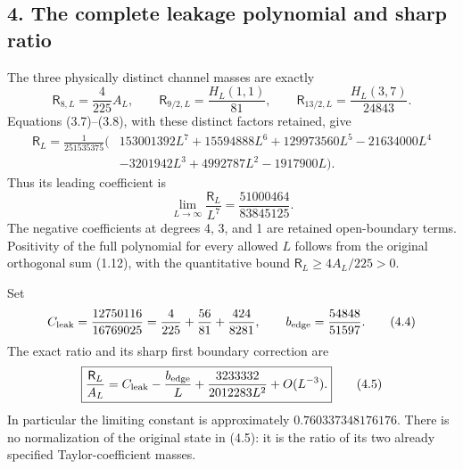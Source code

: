 \documentclass[
  11pt,
]{article}
\begin{document}
\subsection{4. The complete leakage polynomial and sharp
ratio}\label{magnetic-part-11-the-complete-leakage-polynomial-and-sharp-ratio}

The three physically distinct channel masses are exactly \[
 \mathsf R_{8,L}=\frac4{225}A_L,\qquad
 \mathsf R_{9/2,L}=\frac{H_L(1,1)}{81},\qquad
 \mathsf R_{13/2,L}=\frac{H_L(3,7)}{24843}.
\tag{4.1}
\] Equations (3.7)--(3.8), with these distinct factors retained, give \[
\boxed{\begin{split}
 \mathsf R_L
 =\frac1{251535375}\bigl(&153001392L^7+15594888L^6
 +129973560L^5-21634000L^4\\
 &-3201942L^3+4992787L^2-1917900L\bigr).
\end{split}}
\tag{4.2}
\] Thus its leading coefficient is \[
 \lim_{L\to\infty}\frac{\mathsf R_L}{L^7}
       =\frac{51000464}{83845125}.
\tag{4.3}
\] The negative coefficients at degrees 4, 3, and 1 are retained
open-boundary terms. Positivity of the full polynomial for every allowed
\(L\) follows from the original orthogonal sum (1.12), with the
quantitative bound \(\mathsf R_L\ge4A_L/225>0\).

Set \[
 C_{\rm leak}=\frac{12750116}{16769025}
       =\frac4{225}+\frac{56}{81}+\frac{424}{8281},
 \qquad b_{\rm edge}=\frac{54848}{51597}.
\tag{4.4}
\] The exact ratio and its sharp first boundary correction are \[
\boxed{
 \frac{\mathsf R_L}{A_L}
 =C_{\rm leak}-\frac{b_{\rm edge}}L
      +\frac{3233332}{2012283L^2}+O(L^{-3}).}
\tag{4.5}
\] In particular the limiting constant is approximately
\(0.760337348176176\). There is no normalization of the original state
in (4.5): it is the ratio of its two already specified
Taylor-coefficient masses.
\end{document}
